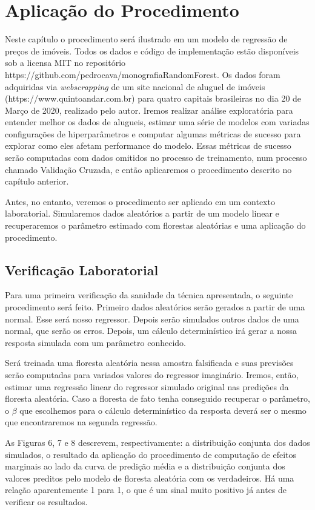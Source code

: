 
\chapter{Aplicação do Procedimento}

Neste capítulo o procedimento será ilustrado em um modelo de regressão de preços de imóveis. Todos os dados e código de implementação estão disponíveis sob a licensa MIT no repositório https://github.com/pedrocava/monografiaRandomForest. Os dados foram adquiridas via \textit{webscrapping} de um site nacional de aluguel de imóveis (https://www.quintoandar.com.br) para quatro capitais brasileiras no dia 20 de Março de 2020, realizado pelo autor. Iremos realizar análise exploratória para entender melhor os dados de alugueis, estimar uma série de modelos com variadas configurações de hiperparâmetros e computar algumas métricas de sucesso para explorar como eles afetam performance do modelo. Essas métricas de sucesso serão computadas com dados omitidos no processo de treinamento, num processo chamado Validação Cruzada, e então aplicaremos o procedimento descrito no capítulo anterior. 


Antes, no entanto, veremos o procedimento ser aplicado em um contexto laboratorial. Simularemos dados aleatórios a partir de um modelo linear e recuperaremos o parâmetro estimado com florestas aleatórias e uma aplicação do procedimento. 


\section{Verificação Laboratorial}

Para uma primeira verificação da sanidade da técnica apresentada, o seguinte procedimento será feito. Primeiro dados aleatórios serão gerados a partir de uma normal. Esse será nosso regressor. Depois serão simulados outros dados de uma normal, que serão os erros. Depois, um cálculo determinístico irá gerar a nossa resposta simulada com um parâmetro conhecido. 

Será treinada uma floresta aleatória nessa amostra falsificada e suas previsões serão computadas para variados valores do regressor imaginário. Iremos, então, estimar uma regressão linear do regressor simulado original nas predições da floresta aleatória. Caso a floresta de fato tenha conseguido recuperar o parâmetro, o $\beta$ que escolhemos para o cálculo determinístico da resposta deverá ser o mesmo que encontraremos na segunda regressão. 

As Figuras 6, 7 e 8 descrevem, respectivamente: a distribuição conjunta dos dados simulados, o resultado da aplicação do procedimento de computação de efeitos marginais ao lado da curva de predição média e a distribuição conjunta dos valores preditos pelo modelo de floresta aleatória com os verdadeiros. Há uma relação aparentemente 1 para 1, o que é um sinal muito positivo já antes de verificar os resultados.


